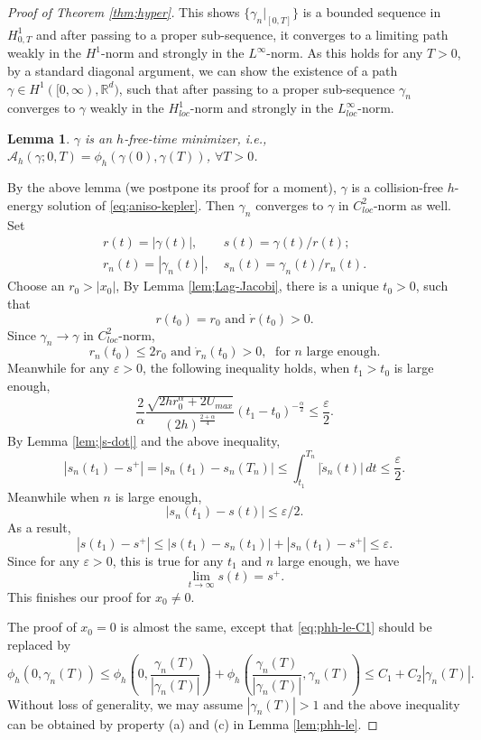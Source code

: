 \documentclass[11pt]{amsart}
\newcommand{\rr}{\mathbb R}
\newcommand{\A}{\mathcal A}
\newcommand{\al}{\alpha}
\newcommand{\gm}{\gamma}
\newcommand{\ep}{\varepsilon}
\theoremstyle{plain}
\newtheorem{lem}{Lemma}[section]
\theoremstyle{definition}
\theoremstyle{remark}
\begin{document}
\begin{proof}[Proof of Theorem \ref{thm;hyper}]
This shows $\{\gm_n|_{[0, T]} \}$ is a bounded sequence in $H^1_{0, T}$ and after passing to a proper sub-sequence, it converges to a limiting path weakly in the $H^1$-norm and strongly in the $L^{\infty}$-norm. As this holds for any $T>0$, by a standard diagonal argument, we can show the existence of a path $\gm \in H^1([0, \infty), \rr^d)$, such that after passing to a proper sub-sequence $\gm_n$ converges to $\gm$ weakly in the $H^1_{loc}$-norm and strongly in the $L^{\infty}_{loc}$-norm. 

\begin{lem}
\label{lem;gm-free-minimizer} $\gm$ is an $h$-free-time minimizer, i.e., $\A_h(\gm; 0, T) = \phi_h(\gm(0), \gm(T))$, $\forall T >0$. 
\end{lem}
By the above lemma (we postpone its proof for a moment), $\gm$ is a collision-free $h$-energy solution of \eqref{eq;aniso-kepler}. Then $\gm_n$ converges to $\gm$ in $C^{2}_{loc}$-norm as well. Set 
$$ \begin{aligned}
	r(t)= |\gm(t)|, \; & s(t) = \gm(t)/r(t); \\
	r_n(t)= |\gm_n(t)|,\; & s_n(t) = \gm_n(t) /r_n(t).
\end{aligned} 
$$
Choose an $r_0 >|x_0|$, By Lemma \ref{lem;Lag-Jacobi}, there is a unique $t_0 >0$, such that 
$$ r(t_0)= r_0 \text{ and } \dot{r}(t_0) >0. $$ 
Since $\gm_n \to \gm$ in  $C^{2}_{loc}$-norm, 
$$ r_n(t_0) \le 2 r_0 \text{ and } \dot{r}_n(t_0) >0, \; \text{ for $n$ large enough.}$$
Meanwhile for any $\ep>0$, the following inequality holds, when $t_1>t_0$ is large enough,
$$\frac{2}{\al} \frac{\sqrt{2h r^{\al}_0+2U_{max}}}{(2h )^{\frac{2 +\al}{4}}}(t_1-t_0)^{-\frac{\al}{2}} \le \frac{\ep}{2}.$$
By Lemma \ref{lem;|s-dot|} and the above inequality, 
\begin{equation}
\label{eq;le-ep/2-1} |s_n(t_1)-s^+|=|s_n(t_1)-s_n(T_n)| \le \int_{t_1}^{T_n}|\dot{s}_n(t)|\,dt \le \frac{\ep}{2}.
\end{equation}
Meanwhile when $n$ is large enough, 
$$ |s_n(t_1)-s(t)| \le \ep/2. $$
As a result, 
$$ |s(t_1) - s^+| \le |s(t_1)- s_n(t_1)| + |s_n(t_1)-s^+| \le \ep. $$
Since for any $\ep>0$, this is true for any $t_1$ and $n$ large enough, we have
$$ \lim_{t \to \infty} s(t) = s^+. $$
This finishes our proof for $x_0 \ne 0$. 

The proof of $x_0 =0$ is almost the same, except that \eqref{eq;phh-le-C1} should be replaced by
$$ \phi_h(0, \gm_n(T)) \le \phi_h \left(0, \frac{\gm_n(T)}{|\gm_n(T)|} \right) + \phi_h \left(\frac{\gm_n(T)}{|\gm_n(T)|}, \gm_n(T) \right) \le C_1 + C_2 |\gm_n(T)|. 
$$
Without loss of generality, we may assume $|\gm_n(T)| >1$ and the above inequality can be obtained by property (a) and (c) in Lemma \ref{lem;phh-le}.
\end{proof}
\end{document}
